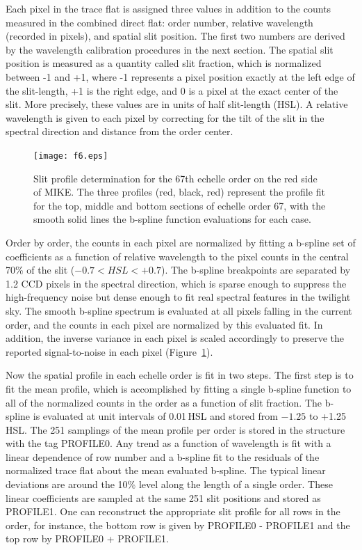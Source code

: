 \documentclass[]{emulateapj}
\begin{document}
Each pixel in the trace flat is assigned three values in addition to the counts
measured in the combined direct flat:  order number, relative wavelength
(recorded in pixels), and spatial slit position.  
The first two numbers are derived by the wavelength calibration
procedures in the next section.
The spatial slit position is measured as a quantity
called slit fraction, which is normalized between -1 and +1, 
where -1 represents a pixel position exactly at the left edge 
of the slit-length, 
+1 is the right edge, and 0 is a pixel at the exact center of the slit.
More precisely, these values are in units of half slit-length (HSL).
A relative wavelength is given to each pixel by correcting for the tilt
of the slit in the spectral direction and distance from the order center.

\begin{figure}
\texttt{[image: f6.eps]}
\caption{Slit profile determination for the 67th echelle order on the red side
of MIKE.  The three profiles (red, black, red)
represent the profile fit for the top, middle and bottom sections of echelle order 67,
with the smooth solid lines the b-spline function evaluations for each case.
}
\label{fig:slitflat}
\end{figure}

Order by order, the counts in each pixel are normalized by 
fitting a b-spline set of 
coefficients as a function of relative wavelength to the pixel counts
in the central 70\% of the slit ($-0.7 < HSL < +0.7$).
The b-spline breakpoints are 
separated by 1.2 CCD pixels in the spectral direction, which is sparse enough
to suppress the high-frequency noise but dense enough to fit real 
spectral features in the twilight sky.
The smooth b-spline spectrum is evaluated at all pixels falling in the current
order, and the counts in each pixel are normalized by this evaluated fit.
In addition, the inverse variance in each pixel is scaled accordingly to 
preserve the reported signal-to-noise in each pixel (Figure~\ref{fig:slitflat}).

Now the spatial profile in each echelle order is fit in two steps.  The first
step is to fit the mean profile, which is accomplished by fitting a single
b-spline function to all of the normalized counts in the order as a function of 
slit fraction.  The b-spline is evaluated at unit intervals of 0.01\,HSL and stored
from $-1.25$ to +1.25\,HSL.  The 251 samplings of the mean profile per order
is stored in the structure with the tag PROFILE0.
Any trend as a function of wavelength is fit with a linear dependence of
row number and a b-spline fit to the residuals of the normalized trace flat
about the mean evaluated b-spline.  The typical linear deviations are 
around the 10\% level along the length of a single order.
These linear coefficients are sampled at the same 251 slit positions and
stored as PROFILE1.  One can reconstruct the appropriate slit profile
for all rows in the order, for instance, the bottom row is given by 
PROFILE0 - PROFILE1 and the top row by PROFILE0 + PROFILE1.
\end{document}

